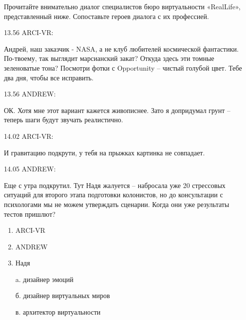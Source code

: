 
Прочитайте внимательно диалог специалистов бюро виртуальности «RealLife», представленный ниже. Сопоставьте героев диалога с их профессией.

13.56 ARCI-VR:

Андрей, наш заказчик - NASA, а не клуб любителей космической фантастики. По-твоему, так выглядит марсианский закат? Откуда здесь эти томные зеленоватые тона? Посмотри фотки с Opportunity – чистый голубой цвет. Тебе два дня, чтобы все исправить.

13.56 ANDREW:

ОК. Хотя мне этот вариант кажется живописнее. Зато я допридумал грунт – теперь шаги будут звучать реалистично.

14.02 ARCI-VR:

И гравитацию подкрути, у тебя на прыжках картинка не совпадает.

14.05 ANDREW:

Еще с утра подкрутил. Тут Надя жалуется – набросала уже 20 стрессовых ситуаций для второго этапа подготовки колонистов, но до консультации с психологами мы не можем утверждать сценарии. Когда они уже результаты тестов пришлют?

\begin{multicols}{2}{
\begin{enumerate}
    \item ARCI-VR
    \item ANDREW
    \item Надя
\end{enumerate}}
{
    \begin{enumerate}
        \item[a.] дизайнер эмоций
        \item[б.] дизайнер виртуальных миров
        \item[в.] архитектор виртуальности
    \end{enumerate}
}
\end{multicols}